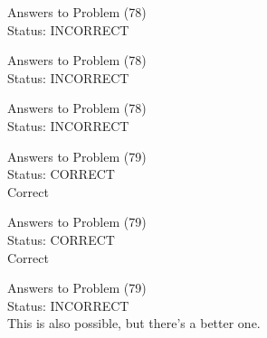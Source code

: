 \documentclass[11pt]{article}
\begin{document}
\begin{minipage}[t]{0.5\textwidth}
  {\centering
  
  Answers to Problem (78)\\
  Status: INCORRECT\\
  
  }
\end{minipage}
\begin{minipage}[t]{0.5\textwidth}
  {\centering
  
  Answers to Problem (78)\\
  Status: INCORRECT\\
  
  }
\end{minipage}
\begin{minipage}[t]{0.5\textwidth}
  {\centering
  
  Answers to Problem (78)\\
  Status: INCORRECT\\
  
  }
\end{minipage}
\begin{minipage}[t]{0.5\textwidth}
  {\centering
  
  Answers to Problem (79)\\
  Status: CORRECT\\
  Correct\\
  }
\end{minipage}
\begin{minipage}[t]{0.5\textwidth}
  {\centering
  
  Answers to Problem (79)\\
  Status: CORRECT\\
  Correct\\
  }
\end{minipage}
\begin{minipage}[t]{0.5\textwidth}
  {\centering
  
  Answers to Problem (79)\\
  Status: INCORRECT\\
  This is also possible, but there's a better one.\\
  }
\end{minipage}
\end{document}

